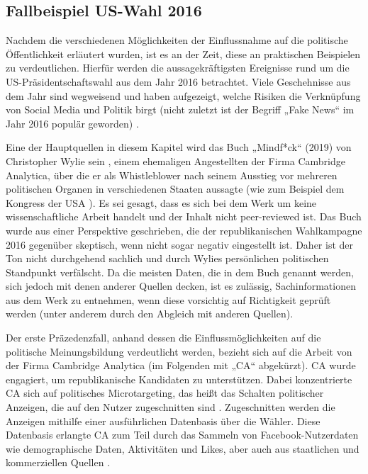 \subsection{Fallbeispiel US-Wahl 2016}
Nachdem die verschiedenen Möglichkeiten der Einflussnahme auf die politische Öffentlichkeit erläutert wurden, ist es an der Zeit, diese an praktischen Beispielen zu verdeutlichen. Hierfür werden die aussagekräftigsten Ereignisse rund um die US-Präsidentschaftswahl aus dem Jahr 2016 betrachtet. Viele Geschehnisse aus dem Jahr sind wegweisend und haben aufgezeigt, welche Risiken die Verknüpfung von Social Media und Politik birgt (nicht zuletzt ist der Begriff „Fake News“ im Jahr 2016 populär geworden) \autocite[vgl.][]{BBCHistoryFN}\autocite[vgl.][]{WashHistoryFN}\autocite[vgl.][]{NatoFN}.

Eine der Hauptquellen in diesem Kapitel wird das Buch „Mindf*ck“ (2019) von Christopher Wylie sein \autocite[vgl.][]{wylie2019mindf}, einem ehemaligen Angestellten der Firma Cambridge Analytica, über die er als Whistleblower nach seinem Ausstieg vor mehreren politischen Organen in verschiedenen Staaten aussagte (wie zum Beispiel dem Kongress der USA \autocite[vgl.][]{CongressWylie}). Es sei gesagt, dass es sich bei dem Werk um keine wissenschaftliche Arbeit handelt und der Inhalt nicht peer-reviewed ist. Das Buch wurde aus einer Perspektive geschrieben, die der republikanischen Wahlkampagne 2016 gegenüber skeptisch, wenn nicht sogar negativ eingestellt ist. Daher ist der Ton nicht durchgehend sachlich und durch Wylies persönlichen politischen Standpunkt verfälscht. Da die meisten Daten, die in dem Buch genannt werden, sich jedoch mit denen anderer Quellen decken, ist es zulässig, Sachinformationen aus dem Werk zu entnehmen, wenn diese vorsichtig auf Richtigkeit geprüft werden (unter anderem durch den Abgleich mit anderen Quellen).

Der erste Präzedenzfall, anhand dessen die Einflussmöglichkeiten auf die politische Meinungsbildung verdeutlicht werden, bezieht sich auf die Arbeit von der Firma Cambridge Analytica (im Folgenden mit „CA“ abgekürzt). CA wurde engagiert, um republikanische Kandidaten zu unterstützen. Dabei konzentrierte CA sich auf politisches Microtargeting, das heißt das Schalten politischer Anzeigen, die auf den Nutzer zugeschnitten sind \autocite[vgl.][]{MicrotargetingBPB}. Zugeschnitten werden die Anzeigen mithilfe einer ausführlichen Datenbasis über die Wähler. Diese Datenbasis erlangte CA zum Teil durch das Sammeln von Facebook-Nutzerdaten wie demographische Daten, Aktivitäten und Likes, aber auch aus staatlichen und kommerziellen Quellen \autocite[vgl.][]{CAdataInsider}.

